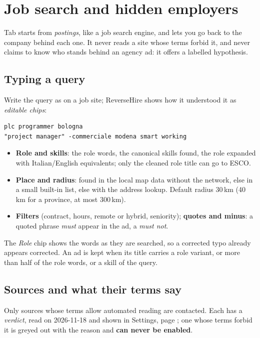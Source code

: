 \chapter{Job search and hidden employers}\label{ch:jobs}

Tab  starts from \emph{postings}, like a job search engine, and lets you go back to the company
behind each one. It never reads a site whose terms forbid it, and never claims to know who stands behind an
agency ad: it offers a labelled hypothesis.

\section{Typing a query}
Write the query as on a job site; ReverseHire shows how it understood it as \emph{editable chips}:
\begin{lstlisting}
plc programmer bologna
"project manager" -commerciale modena smart working
\end{lstlisting}
\begin{itemize}
  \item \textbf{Role and skills}: the role words, the canonical skills found, the role expanded with
        Italian/English equivalents; only the cleaned role title can go to ESCO.
  \item \textbf{Place and radius}: found in the local map data without the network, else in a small built-in
        list, else with the address lookup. Default radius 30\,km (40\,km for a province, at most 300\,km).
  \item \textbf{Filters} (contract, hours, remote or hybrid, seniority); \textbf{quotes and minus}: a quoted
        phrase \emph{must} appear in the ad, a  \emph{must not}.
\end{itemize}
The \emph{Role} chip shows the words as they are searched, so a corrected typo already appears corrected. An ad is kept when its title carries a role variant, or more than half of the role words, or a skill of the query.

\section{Sources and what their terms say}\label{sec:jobsources}
Only sources whose terms allow automated reading are contacted. Each has a \emph{verdict}, read on 2026-11-18 and
shown in Settings, page ; one whose terms forbid it is greyed out with the reason and
\textbf{can never be enabled}.

